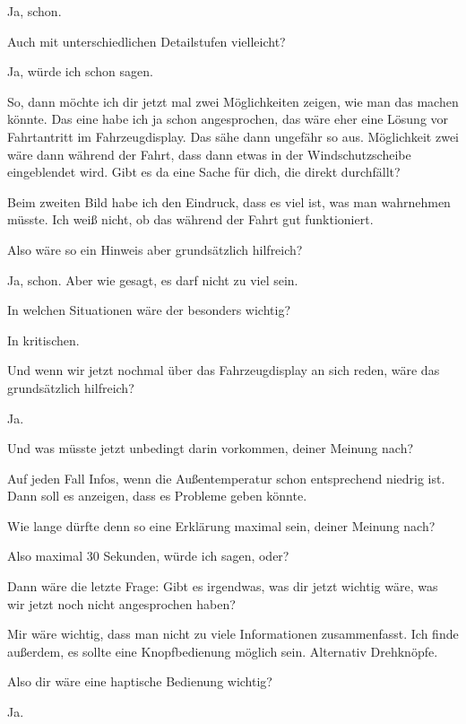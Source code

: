 Ja, schon.

\interviewerin
Auch mit unterschiedlichen Detailstufen vielleicht?

Ja, würde ich schon sagen.

\interviewerin
So, dann möchte ich dir jetzt mal zwei Möglichkeiten zeigen, wie man
das machen könnte. Das eine habe ich ja schon angesprochen, das wäre
eher eine Lösung vor Fahrtantritt im Fahrzeugdisplay. Das sähe dann
ungefähr so aus. Möglichkeit zwei wäre dann während der Fahrt, dass
dann etwas in der Windschutzscheibe eingeblendet wird. Gibt es da eine
Sache für dich, die direkt durchfällt?

Beim zweiten Bild habe ich den Eindruck, dass es viel ist, was man
wahrnehmen müsste. Ich weiß nicht, ob das während der Fahrt gut
funktioniert.

\interviewerin
Also wäre so ein Hinweis aber grundsätzlich hilfreich?

Ja, schon. Aber wie gesagt, es darf nicht zu viel sein.

\interviewerin
In welchen Situationen wäre der besonders wichtig?

In kritischen.

\interviewerin
Und wenn wir jetzt nochmal über das Fahrzeugdisplay an sich reden, wäre
das grundsätzlich hilfreich?

Ja.

\interviewerin
Und was müsste jetzt unbedingt darin vorkommen, deiner Meinung nach?

Auf jeden Fall Infos, wenn die Außentemperatur schon entsprechend
niedrig ist. Dann soll es anzeigen, dass es Probleme geben könnte.

\interviewerin
Wie lange dürfte denn so eine Erklärung maximal sein, deiner Meinung
nach?

Also maximal 30 Sekunden, würde ich sagen, oder?

\interviewerin
Dann wäre die letzte Frage: Gibt es irgendwas, was dir jetzt wichtig
wäre, was wir jetzt noch nicht angesprochen haben?

Mir wäre wichtig, dass man nicht zu viele Informationen zusammenfasst.
Ich finde außerdem, es sollte eine Knopfbedienung möglich sein.
Alternativ Drehknöpfe.

\interviewerin
Also dir wäre eine haptische Bedienung wichtig?

Ja.

